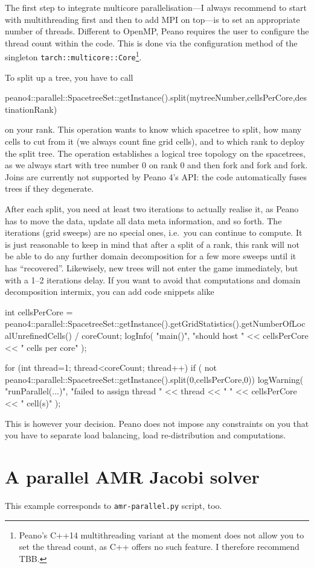The first step to integrate multicore parallelisation---I always recommend to
start with multithreading first and then to add MPI on top---is to set an
appropriate number of threads.
Different to OpenMP, Peano requires the user to configure the thread count
within the code. 
This is done via the configuration method of the singleton
\texttt{tarch::multicore::Core}\footnote{Peano's C++14 multithreading variant
at the moment does not allow you to set the thread count, as C++ offers no such
feature. I therefore recommend TBB.}.


To split up a tree, you have to call
\begin{code}
  peano4::parallel::SpacetreeSet::getInstance().split(mytreeNumber,cellsPerCore,destinationRank)
\end{code}
\noindent
on your rank. This operation wants to know which spacetree to split, how many
cells to cut from it (we always count fine grid cells), and to which rank to
deploy the split tree.
The operation establishes a logical tree topology on the spacetrees, as we
always start with tree number 0 on rank 0 and then fork and fork and fork.
Joins are currently not supported by Peano 4's API: the code automatically fuses
trees if they degenerate.


After each split, you need at least two iterations to actually realise it, as 
Peano has to move the data, update all data meta information, and so forth. 
The iterations (grid sweeps) are no special ones, i.e.~you can continue to
compute.
It is just reasonable to keep in mind that after a split of a rank, this rank
will not be able to do any further domain decomposition for a few more sweeps
until it has ``recovered''. 
Likewisely, new trees will not enter the game immediately, but with a 1--2
iterations delay.
If you want to avoid that computations and domain decomposition intermix, you
can add code snippets alike

\begin{code}
int cellsPerCore = peano4::parallel::SpacetreeSet::getInstance().getGridStatistics().getNumberOfLocalUnrefinedCells() / coreCount;
logInfo( "main()", "should host " << cellsPerCore << " cells per core" );

for (int thread=1; thread<coreCount; thread++) {
  if ( not peano4::parallel::SpacetreeSet::getInstance().split(0,cellsPerCore,0)) { 
   logWarning( "runParallel(...)", "failed to assign thread " << thread << " " << cellsPerCore << " cell(s)" ); 
  }
}
\end{code}

\noindent
This is however your decision. Peano does not impose any constraints on you that
you have to separate load balancing, load re-distribution and computations.


\section{A parallel AMR Jacobi solver}

\begin{remark}
 This example corresponds to \texttt{amr-parallel.py} script, too.
\end{remark}
